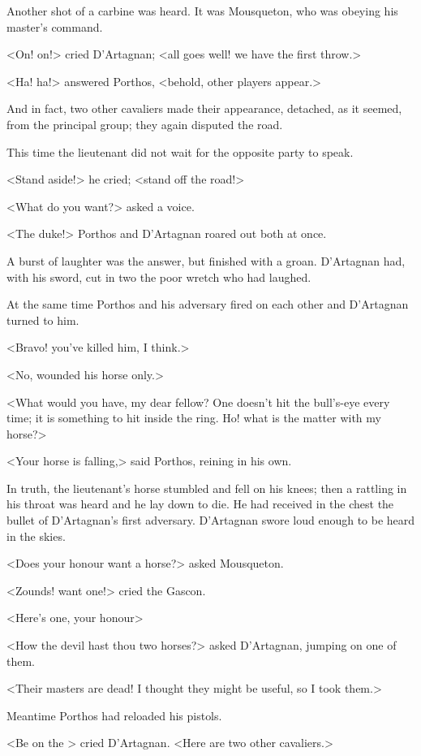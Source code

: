 Another shot of a carbine was heard. It was Mousqueton, who was obeying his master's command.

<On! on!> cried D'Artagnan; <all goes well! we have the first throw.>

<Ha! ha!> answered Porthos, <behold, other players appear.>

And in fact, two other cavaliers made their appearance, detached, as it seemed, from the principal group; they again disputed the road.

This time the lieutenant did not wait for the opposite party to speak.

<Stand aside!> he cried; <stand off the road!>

<What do you want?> asked a voice.

<The duke!> Porthos and D'Artagnan roared out both at once.

A burst of laughter was the answer, but finished with a groan. D'Artagnan had, with his sword, cut in two the poor wretch who had laughed.

At the same time Porthos and his adversary fired on each other and D'Artagnan turned to him.

<Bravo! you've killed him, I think.>

<No, wounded his horse only.>

<What would you have, my dear fellow? One doesn't hit the bull's-eye every time; it is something to hit inside the ring. Ho!  what is the matter with my horse?>

<Your horse is falling,> said Porthos, reining in his own.

In truth, the lieutenant's horse stumbled and fell on his knees; then a rattling in his throat was heard and he lay down to die. He had received in the chest the bullet of D'Artagnan's first adversary. D'Artagnan swore loud enough to be heard in the skies.

<Does your honour want a horse?> asked Mousqueton.

<Zounds! want one!> cried the Gascon.

<Here's one, your honour\longdash>

<How the devil hast thou two horses?> asked D'Artagnan, jumping on one of them.

<Their masters are dead! I thought they might be useful, so I took them.>

Meantime Porthos had reloaded his pistols.

<Be on the > cried D'Artagnan. <Here are two other cavaliers.>

